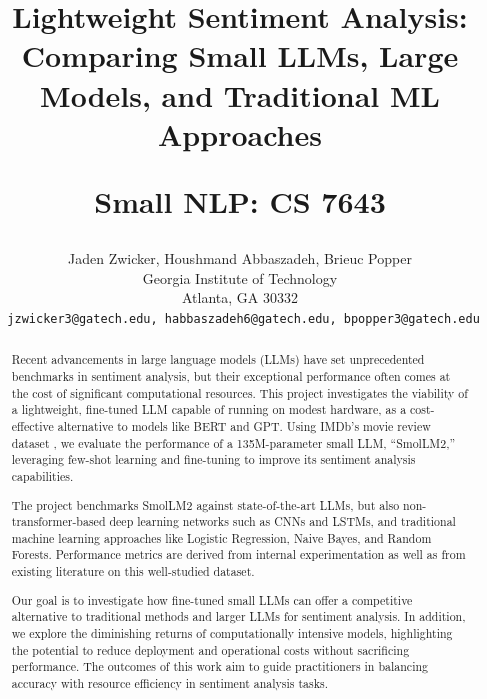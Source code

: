 \documentclass[10pt,twocolumn,letterpaper]{article}
\begin{document}
\title{
Lightweight Sentiment Analysis: Comparing Small LLMs, Large Models, and Traditional ML Approaches

Small NLP: CS 7643
}

\author{
Jaden Zwicker, 
Houshmand Abbaszadeh,
Brieuc Popper
\\
Georgia Institute of Technology\\
Atlanta, GA 30332\\
{\tt\small 
jzwicker3@gatech.edu, 
habbaszadeh6@gatech.edu, 
bpopper3@gatech.edu}
}



\maketitle

\begin{abstract}
Recent advancements in large language models (LLMs) have set unprecedented benchmarks in sentiment analysis, but their exceptional performance often comes at the cost of significant computational resources. This project investigates the viability of a lightweight, fine-tuned LLM capable of running on modest hardware, as a cost-effective alternative to models like BERT and GPT. Using IMDb’s movie review dataset \cite{IMDB-dataset}, we evaluate the performance of a 135M-parameter small LLM, “SmolLM2,” leveraging few-shot learning and fine-tuning to improve its sentiment analysis capabilities.

The project benchmarks SmolLM2 against state-of-the-art LLMs, but also non-transformer-based deep learning networks such as CNNs and LSTMs, and traditional machine learning approaches like Logistic Regression, Naive Bayes, and Random Forests. Performance metrics are derived from internal experimentation as well as from existing literature on this well-studied dataset.

Our goal is to investigate how fine-tuned small LLMs can offer a competitive alternative to traditional methods and larger LLMs for sentiment analysis. In addition, we explore the diminishing returns of computationally intensive models, highlighting the potential to reduce deployment and operational costs without sacrificing performance. The outcomes of this work aim to guide practitioners in balancing accuracy with resource efficiency in sentiment analysis tasks.

\end{abstract}
\end{document}
